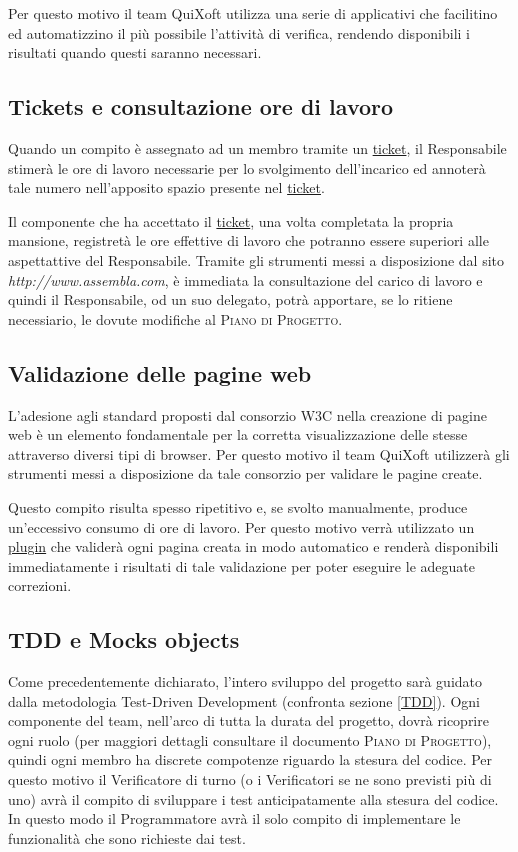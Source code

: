 \documentclass[11pt,a4paper]{article}
\begin{document}
Per questo motivo il team QuiXoft utilizza una serie di applicativi che facilitino ed automatizzino il più possibile l'attività di verifica, rendendo disponibili i risultati quando questi saranno necessari.

\subsection{Tickets e consultazione ore di lavoro}
Quando un compito è assegnato ad un membro tramite un \underline{ticket}, il Responsabile stimerà le ore di lavoro necessarie per lo svolgimento dell'incarico ed annoterà tale numero nell'apposito spazio presente nel \underline{ticket}.

Il componente che ha accettato il \underline{ticket}, una volta completata la propria mansione, registretà le ore effettive di lavoro che potranno essere superiori alle aspettattive del Responsabile. Tramite gli strumenti messi a disposizione dal sito \textit{http://www.assembla.com}, è immediata la consultazione del carico di lavoro e quindi il Responsabile, od un suo delegato, potrà apportare, se lo ritiene necessiario, le dovute modifiche al \textsc{Piano di Progetto}.

\subsection{Validazione delle pagine web}
L'adesione agli standard proposti dal consorzio W3C nella creazione di pagine web è un elemento fondamentale per la corretta visualizzazione delle stesse attraverso diversi tipi di browser. Per questo motivo il team QuiXoft utilizzerà gli strumenti messi a disposizione da tale consorzio per validare le pagine create.

Questo compito risulta spesso ripetitivo e, se svolto manualmente, produce un'eccessivo consumo di ore di lavoro. Per questo motivo verrà utilizzato un \underline{plugin} che validerà ogni pagina creata in modo automatico e renderà disponibili immediatamente i risultati di tale validazione per poter eseguire le adeguate correzioni.

\subsection{TDD e Mocks objects }
Come precedentemente dichiarato, l'intero sviluppo del progetto sarà guidato dalla metodologia Test-Driven Development (confronta sezione \ref{TDD}). Ogni componente del team, nell'arco di tutta la durata del progetto, dovrà ricoprire ogni ruolo (per maggiori dettagli consultare il documento \textsc{Piano di Progetto}), quindi ogni membro ha discrete compotenze riguardo la stesura del codice. Per questo motivo il Verificatore di turno (o i Verificatori se ne sono previsti più di uno) avrà il compito di sviluppare i test anticipatamente alla stesura del codice. In questo modo il Programmatore avrà il solo compito di implementare le funzionalità che sono richieste dai test.
\end{document}
